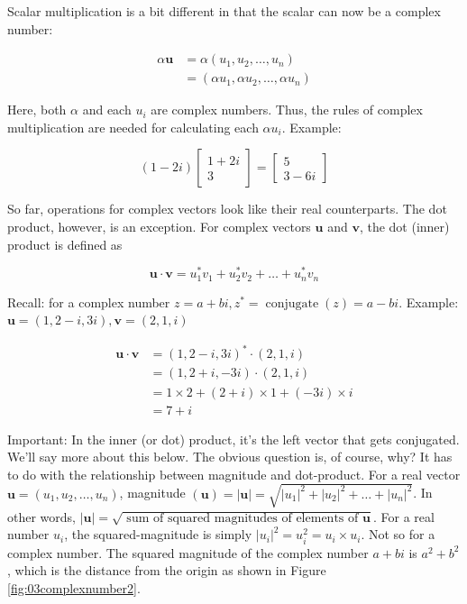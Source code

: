\documentclass[main.tex]{subfiles}
\begin{document}
    Scalar multiplication is a bit different in that the scalar can now be a complex number:
    
    $$
    \begin{aligned}
    \alpha \mathbf{u} &=\alpha\left(u_{1}, u_{2}, \ldots, u_{n}\right) \\
    &=\left(\alpha u_{1}, \alpha u_{2}, \ldots, \alpha u_{n}\right)
    \end{aligned}
    $$
    
    Here, both $\alpha$ and each $u_{i}$ are complex numbers. Thus, the rules of complex multiplication are needed for calculating each $\alpha u_{i}$. Example:
    
    $$
    (1-2 i)\left[\begin{array}{r}
    1+2 i \\
    3
    \end{array}\right]=\left[\begin{array}{r}
    5 \\
    3-6 i
    \end{array}\right]
    $$
    
    So far, operations for complex vectors look like their real counterparts. The dot product, however, is an exception. For complex vectors $\mathbf{u}$ and $\mathbf{v}$, the dot (inner) product is defined as
    
    $$
    \mathbf{u} \cdot \mathbf{v}=u_{1}^{*} v_{1}+u_{2}^{*} v_{2}+\ldots+u_{n}^{*} v_{n}
    $$
    
    Recall: for a complex number $z=a+b i, z^{*}=\operatorname{conjugate}(z)=a-b i$. Example: $\mathbf{u}=(1,2-i, 3 i), \mathbf{v}=(2,1, i)$
    
    $$
    \begin{aligned}
    \mathbf{u} \cdot \mathbf{v} &=(1,2-i, 3 i)^{*} \cdot(2,1, i) \\
    &=(1,2+i,-3 i) \cdot(2,1, i) \\
    &=1 \times 2+(2+i) \times 1+(-3 i) \times i \\
    &=7+i
    \end{aligned}
    $$
    
    Important: In the inner (or dot) product, it's the left vector that gets conjugated. We'll say more about this below. The obvious question is, of course, why? It has to do with the relationship between magnitude and dot-product. For a real vector $\mathbf{u}=\left(u_{1}, u_{2}, \ldots, u_{n}\right)$, magnitude $(\mathbf{u})=|\mathbf{u}|=\sqrt{\left|u_{1}\right|^{2}+\left|u_{2}\right|^{2}+\ldots+\left|u_{n}\right|^{2}}$. In other words, $|\mathbf{u}|=\sqrt{\text { sum of squared magnitudes of elements of } \mathbf{u}}$. For a real number $u_{i}$, the squared-magnitude is simply $\left|u_{i}\right|^{2}=u_{i}^{2}=u_{i} \times u_{i}$. Not so for a complex number. The squared magnitude of the complex number $a+b i$ is $a^{2}+b^{2}$, which is the distance from the origin as shown in Figure \ref{fig:03complexnumber2}.
    
\end{document}
